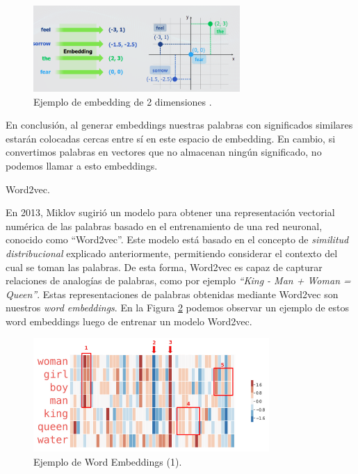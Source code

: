 \documentclass[12pt,a4paper]{article}
\makeatletter
\renewcommand\paragraph{\@startsection{paragraph}{4}{\z@}
            {-2.5ex\@plus -1ex \@minus -.25ex}
            {1.25ex \@plus .25ex}
            {\normalfont\normalsize\bfseries}}
\makeatother
\begin{document}
\begin{sloppypar}
\begin{figure}[H]    
 \centering
 \includegraphics[width=0.7\textwidth]{images/NLP/12.png}
 \caption{ Ejemplo de embedding de 2 dimensiones \cite{NLP_28}.}
 \label{fig:Imagen_NLP_12}
\end{figure}

En conclusión, al generar embeddings nuestras palabras con significados similares estarán colocadas cercas entre sí en este espacio de embedding. En cambio, si convertimos palabras en vectores que no almacenan ningún significado, no podemos llamar a esto embeddings. 

\cleardoublepage

\paragraph{Word2vec.}\label{word2vec}

En 2013, Miklov\cite{NLP_11} sugirió un modelo para obtener una representación vectorial numérica de las palabras basado en el entrenamiento de una red neuronal, conocido como “Word2vec”. Este modelo está basado en el concepto de \textit{similitud distribucional} explicado anteriormente, permitiendo considerar el contexto del cual se toman las palabras. De esta forma, Word2vec es capaz de capturar relaciones de analogías de palabras, como por ejemplo \textit{“King - Man + Woman = Queen”}.  Estas representaciones de palabras obtenidas mediante Word2vec son nuestros \textit{word embeddings}. En la Figura \ref{fig:Imagen_NLP_13} podemos observar un ejemplo de estos word embeddings luego de entrenar un modelo Word2vec.

\begin{figure}[H]    
 \centering
 \includegraphics[width=0.8\textwidth]{images/NLP/13.png}
 \caption{Ejemplo de Word Embeddings (1)\cite{datitos_nlp}.}
 \label{fig:Imagen_NLP_13}
\end{figure}


\end{sloppypar}
\end{document}

